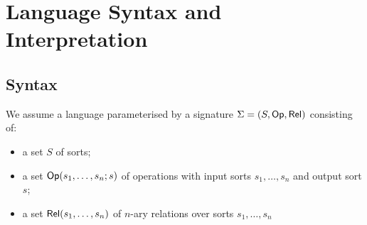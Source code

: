 \section{Language Syntax and Interpretation}

\subsection{Syntax}

We assume a language parameterised by a signature $\Sigma = (S, \mathsf{Op}, \mathsf{Rel})$ consisting of:
\begin{itemize}
\item a set $S$ of sorts;
\item a set $\mathsf{Op}(s_1, \ldots, s_n; s)$ of operations with input sorts $s_1, \ldots, s_n$ and output sort $s$;
\item a set $\mathsf{Rel}(s_1, \ldots, s_n)$ of $n$-ary relations over sorts $s_1, \ldots, s_n$
\end{itemize}

\noindent {}



%
